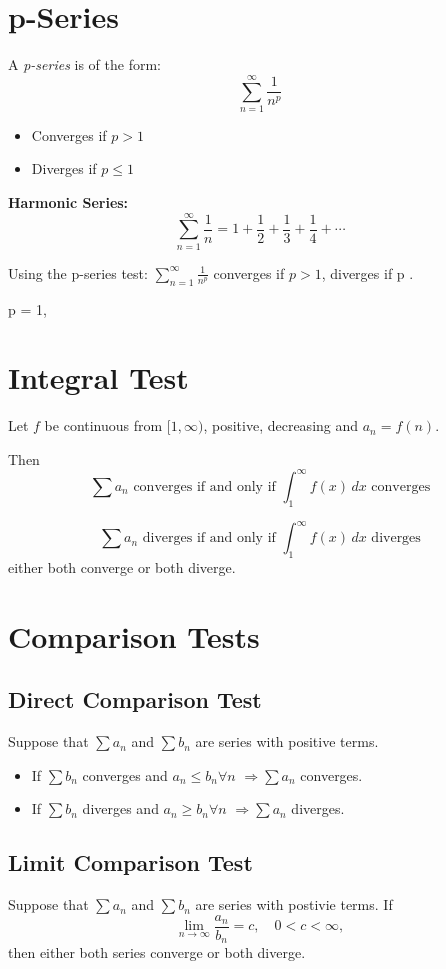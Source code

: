 \documentclass[11pt]{article}
\theoremstyle{mydef}
\begin{document}
\section*{p-Series}
A \textit{p-series} is of the form:
\[
\sum_{n=1}^{\infty} \frac{1}{n^p}
\]

\begin{itemize}
\item Converges if $p>1$
\item Diverges if $p\le1$
\end{itemize}

\textbf{Harmonic Series:}
\[
\sum_{n=1}^{\infty} \frac{1}{n} = 1 + \frac{1}{2} + \frac{1}{3} + \frac{1}{4} + \cdots
\]

Using the p-series test: $\sum_{n=1}^{\infty} \frac{1}{n^p}$ converges if $p>1$, diverges if p .

 p = 1, 

\section*{Integral Test}

Let $f$ be continuous from $[1,\infty)$, positive, decreasing and $a_n=f(n)$.

Then
\[
\sum a_n \text{  converges if and only if } \int_1^\infty f(x)\,dx \text{ converges}
\]

\[
\sum a_n \text{  diverges if and only if } \int_1^\infty f(x)\,dx \text{ diverges}
\]
either both converge or both diverge.

\section*{Comparison Tests}

\subsection*{Direct Comparison Test}
Suppose that $\sum a_n$ and $\sum b_n$ are series with positive terms.

\begin{itemize}
\item If $\sum b_n$ converges and $a_n\leq b_n  \forall n$ $\Rightarrow \sum a_n$ converges.
\item If $\sum b_n$ diverges and $a_n\geq b_n \forall n$ $\Rightarrow \sum a_n$ diverges.
\end{itemize}

\subsection*{Limit Comparison Test}
Suppose  that $\sum a_n$ and $\sum b_n$ are series with postivie terms. If 
\[
\lim_{n\to\infty}\frac{a_n}{b_n}=c,
\quad 0<c<\infty,
\]
then either both series converge or both diverge.
\end{document}

